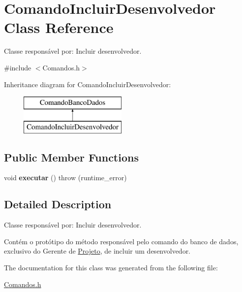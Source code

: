 \hypertarget{class_comando_incluir_desenvolvedor}{}\section{Comando\+Incluir\+Desenvolvedor Class Reference}
\label{class_comando_incluir_desenvolvedor}


Classe responsável por\+: Incluir desenvolvedor.  




{\ttfamily \#include $<$Comandos.\+h$>$}

Inheritance diagram for Comando\+Incluir\+Desenvolvedor\+:\begin{figure}[H]
\begin{center}
\leavevmode
\includegraphics[height=2.000000cm]{class_comando_incluir_desenvolvedor}
\end{center}
\end{figure}
\subsection*{Public Member Functions}
\begin{DoxyCompactItemize}
\item 
\hypertarget{class_comando_incluir_desenvolvedor_a03138e5bdb37d0fd6da8bc25e002cbe7}{}\label{class_comando_incluir_desenvolvedor_a03138e5bdb37d0fd6da8bc25e002cbe7} 
void {\bfseries executar} ()  throw (runtime\+\_\+error)
\end{DoxyCompactItemize}


\subsection{Detailed Description}
Classe responsável por\+: Incluir desenvolvedor. 

Contém o protótipo do método responsável pelo comando do banco de dados, exclusivo do Gerente de \hyperlink{class_projeto}{Projeto}, de incluir um desenvolvedor. 

The documentation for this class was generated from the following file\+:\begin{DoxyCompactItemize}
\item 
\hyperlink{_comandos_8h}{Comandos.\+h}\end{DoxyCompactItemize}
